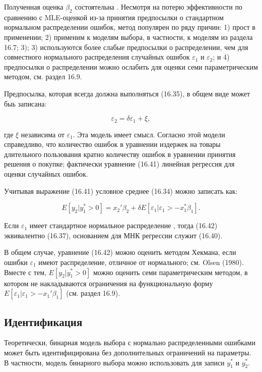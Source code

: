Полученная оценка $\beta_2$ состоятельна . Несмотря на потерю эффективности по сравнению с MLE-оценкой из-за принятия предпосылки о стандартном нормальном распределении ошибок, метод популярен по ряду причин: 1) прост в применении; 2) применим к моделям выбора, в частности, к моделям из раздела 16.7; 3); 3) используются более слабые предпосылки о распределении, чем для совместного нормального распределения случайных ошибок $\varepsilon_1$ и $\varepsilon_2$; и 4) предпосылки о распределении можно ослабить для оценки семи параметрическим методом, см. раздел 16.9.

Предпосылка, которая всегда должна выполняться (16.35), в общем виде может быь записана:

\begin{equation}
\varepsilon_2=\delta\varepsilon_1+\xi,
\end{equation}

где $\xi$ независима от $\varepsilon_1$. Эта модель имеет смысл. Согласно этой модели справедливо, что количество ошибок в уравнении издержек на товары длительного пользования кратно количеству ошибок в уравнении принятия решения о покупке; фактически уравнение (16.41) линейная регрессия для оценки случайных ошибок.

Учитывая выражение (16.41) условное среднее (16.34) можно записать как:

\begin{equation}
E[y_2|y_1^{*}>0]=x_2'\beta_2+\delta E[\varepsilon_1|\varepsilon_1>-x_1^{*}\beta_1].
\end{equation}

Если $\varepsilon_1$ имеет стандартное нормальное распределение , тогда (16.42) эквивалентно (16.37), основанием для МНК регрессии служит (16.40).

В общем случае, уравнение (16.42) можно оценить методом Хекмана, если ошибки $\varepsilon_1$ имеют распределение, отличное от нормального; см. Olsen (1980). Вместе с тем, $E[y_2|y_1^{*}>0]$ можно оценить семи параметрическим методом, в котором не накладываются ограничения на функциональную форму  $E[\varepsilon_1|\varepsilon_1>-x_1'\beta_1]$ (см. раздел 16.9). 

\subsection{Идентификация}

Теоретически, бинарная модель выбора с нормально распределенными ошибками может быть идентифицирована без дополнительных ограничений на параметры. В частности, модель бинарного выбора можно использовать для записи $y_1^{*}$ и $y_2^{*}$. 

